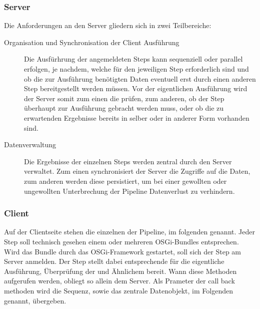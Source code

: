 \subsubsection{Server}
Die Anforderungen an den Server gliedern sich in zwei Teilbereiche:
\begin{description}
\item[Organisation und Synchronisation der Client Ausführung]
Die Ausfürhrung der angemeldeten Steps kann sequenziell oder
parallel erfolgen, je nachdem, welche  für den
jeweiligen Step erforderlich sind und ob die zur Ausführung benötigten Daten eventuell erst
durch einen anderen Step bereitgestellt werden müssen. Vor der eigentlichen
Ausführung wird der Server somit zum einen die 
prüfen, zum anderen, ob der Step überhaupt zur Ausführung
gebracht werden muss, oder ob die zu erwartenden Ergebnisse bereits in selber
oder in anderer Form vorhanden sind.
\item[Datenverwaltung] Die Ergebnisse der einzelnen Steps werden zentral durch
den Server verwaltet.
Zum einen synchronisiert der Server die Zugriffe auf die Daten, zum anderen
werden diese persistiert, um bei einer gewollten oder ungewollten Unterbrechung
der Pipeline Datenverlust zu verhindern.
\end{description}

\subsubsection{Client}
Auf der Clientseite stehen die einzelnen  der Pipeline, im
folgenden  genannt. Jeder Step soll technisch gesehen einem oder
mehreren OSGi-Bundles entsprechen.
Wird das Bundle durch das OSGi-Framework gestartet, soll sich der Step am Server
anmelden. Der Step stellt dabei entsprechende  für die
eigentliche Ausführung, Überprüfung der  und
Ähnlichem bereit.
Wann diese Methoden aufgerufen werden, obliegt so allein
dem Server.
Als Prameter der call back methoden wird die Sequenz, sowie das zentrale
Datenobjekt, im Folgenden  genannt,
übergeben.

